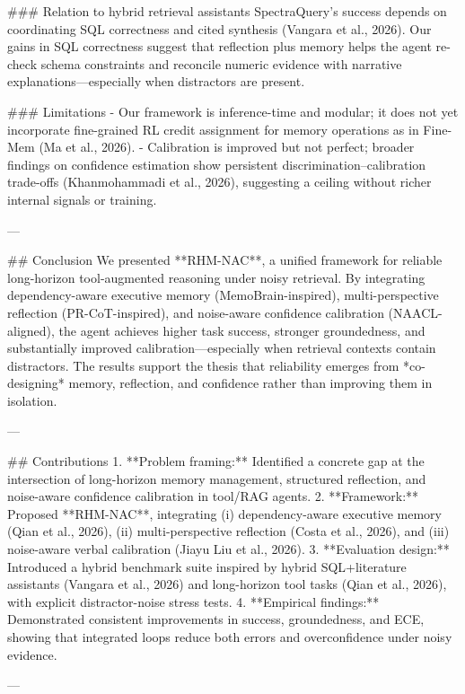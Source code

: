 ### Relation to hybrid retrieval assistants  
SpectraQuery’s success depends on coordinating SQL correctness and cited synthesis (Vangara et al., 2026). Our gains in SQL correctness suggest that reflection plus memory helps the agent re-check schema constraints and reconcile numeric evidence with narrative explanations—especially when distractors are present.

### Limitations  
- Our framework is inference-time and modular; it does not yet incorporate fine-grained RL credit assignment for memory operations as in Fine-Mem (Ma et al., 2026).  
- Calibration is improved but not perfect; broader findings on confidence estimation show persistent discrimination–calibration trade-offs (Khanmohammadi et al., 2026), suggesting a ceiling without richer internal signals or training.

---

## Conclusion  
We presented **RHM-NAC**, a unified framework for reliable long-horizon tool-augmented reasoning under noisy retrieval. By integrating dependency-aware executive memory (MemoBrain-inspired), multi-perspective reflection (PR-CoT-inspired), and noise-aware confidence calibration (NAACL-aligned), the agent achieves higher task success, stronger groundedness, and substantially improved calibration—especially when retrieval contexts contain distractors. The results support the thesis that reliability emerges from *co-designing* memory, reflection, and confidence rather than improving them in isolation.

---

## Contributions  
1. **Problem framing:** Identified a concrete gap at the intersection of long-horizon memory management, structured reflection, and noise-aware confidence calibration in tool/RAG agents.  
2. **Framework:** Proposed **RHM-NAC**, integrating (i) dependency-aware executive memory (Qian et al., 2026), (ii) multi-perspective reflection (Costa et al., 2026), and (iii) noise-aware verbal calibration (Jiayu Liu et al., 2026).  
3. **Evaluation design:** Introduced a hybrid benchmark suite inspired by hybrid SQL+literature assistants (Vangara et al., 2026) and long-horizon tool tasks (Qian et al., 2026), with explicit distractor-noise stress tests.  
4. **Empirical findings:** Demonstrated consistent improvements in success, groundedness, and ECE, showing that integrated loops reduce both errors and overconfidence under noisy evidence.

---